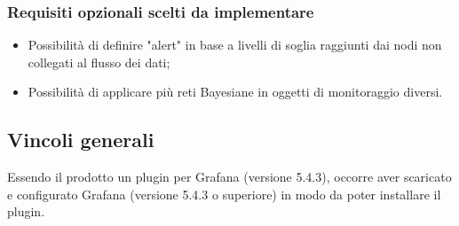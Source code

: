		        \subsubsection{Requisiti opzionali scelti da implementare}
				\begin{itemize}
					\item Possibilità di definire "alert" in base a livelli di soglia raggiunti dai nodi non collegati al flusso dei dati;
					\item Possibilità di applicare più reti Bayesiane in oggetti di monitoraggio diversi.
	        		\end{itemize}
				
				
			\subsection{Vincoli generali}			
Essendo il prodotto un plugin per Grafana (versione 5.4.3), occorre aver scaricato e configurato Grafana (versione 5.4.3 o superiore) in modo da poter installare il plugin.